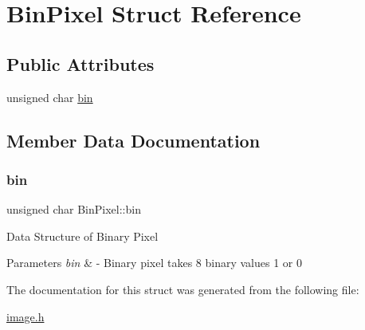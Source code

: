 \hypertarget{struct_bin_pixel}{}\section{Bin\+Pixel Struct Reference}
\label{struct_bin_pixel}
\subsection*{Public Attributes}
\begin{DoxyCompactItemize}
\item 
unsigned char \hyperlink{struct_bin_pixel_a8d70832d825384a075174341af8e6204}{bin}
\end{DoxyCompactItemize}


\subsection{Member Data Documentation}
\mbox{\label{struct_bin_pixel_a8d70832d825384a075174341af8e6204}} 
\subsubsection{\texorpdfstring{bin}{bin}}
{\footnotesize\ttfamily unsigned char Bin\+Pixel\+::bin}

Data Structure of Binary Pixel 
\begin{DoxyParams}{Parameters}
{\em bin} & -\/ Binary pixel takes 8 binary values 1 or 0 \\
\hline
\end{DoxyParams}


The documentation for this struct was generated from the following file\+:\begin{DoxyCompactItemize}
\item 
\hyperlink{image_8h}{image.\+h}\end{DoxyCompactItemize}
